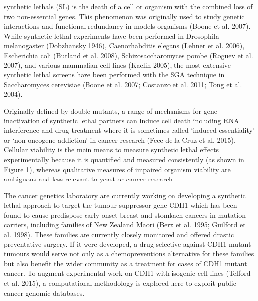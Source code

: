 \Glspl{synthetic lethal} (SL) is the death of a cell or organism with the combined loss of two non-\gls{essential} genes.   This phenomenon was originally used to study genetic interactions and \gls{functional redundancy} in models organisms (Boone et al. 2007).   While \gls{synthetic lethal} experiments have been performed in Drosophila melanogaster (Dobzhansky 1946), Caenorhabditis elegans (Lehner et al. 2006), Escherichia coli (Butland et al. 2008), Schizosaccharomyces pombe (Roguev et al. 2007), and various mammalian cell lines (Kaelin 2005), the most extensive \gls{synthetic lethal} screens have been performed with the \gls{SGA} technique in Saccharomyces cerevisiae (Boone et al. 2007; Costanzo et al. 2011; Tong et al. 2004).  

Originally defined by double \glspl{mutant}, a range of mechanisms for gene inactivation of \gls{synthetic lethal} partners can induce cell death including \acrshort{RNA} interference and drug treatment where it is sometimes called ‘\gls{induced essentiality}’ or ‘\gls{non-oncogene addiction}’ in cancer research (Fece de la Cruz et al. 2015).  Cellular viability is the main means to measure \gls{synthetic lethal} effects experimentally because it is quantified and measured consistently (as shown in Figure 1), whereas qualitative measures of impaired organism viability are ambiguous and less relevant to yeast or cancer research.

The cancer genetics laboratory are currently working on developing a \gls{synthetic lethal} approach to target the \gls{tumour suppressor} gene CDH1 which has been found to cause predispose early-onset breast and stomkach cancers in \gls{mutation} carriers, including families of New Zealand M\={a}ori (Berx et al. 1995; Guilford et al. 1998).  These families are currently closely monitored and offered drastic preventative surgery.  If it were developed, a drug selective against CDH1 \gls{mutant} \glspl{tumour} would serve not only as a \glspl{chemoprevention} alternative for these families but also benefit the wider community as a treatment for  cases of CDH1 \gls{mutant} cancer.  To augment experimental work on CDH1 with isogenic cell lines (Telford et al. 2015), a computational methodology is explored here to exploit public cancer \gls{genomic} databases.

